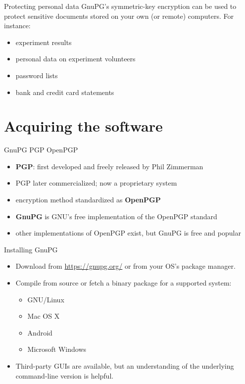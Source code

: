 \documentclass[
mode=present,
paper=smartboard,
size=20pt,
]{powerdot}
\begin{document}
\begin{slide}{Protecting personal data}
  GnuPG's symmetric-key encryption can be used to protect sensitive
  documents stored on your own (or remote) computers.  For instance:\\[1ex]
  \begin{itemize}
  \item experiment results
  \item personal data on experiment volunteers
  \item password lists
  \item bank and credit card statements
  \end{itemize}
\end{slide}


\section{Acquiring the software}

\begin{slide}{GnuPG \vs PGP \vs OpenPGP}
  \begin{itemize}
  \item \textbf{PGP}: first developed and freely released by Phil Zimmerman
  \item PGP later commercialized; now a proprietary system
  \item encryption method standardized as \textbf{OpenPGP}
  \item \textbf{GnuPG} is GNU's free implementation of the OpenPGP standard
  \item other implementations of OpenPGP exist, but GnuPG is free and
    popular
  \end{itemize}
\end{slide}

\begin{slide}{Installing GnuPG}
  \begin{itemize}
  \item Download from \url{https://gnupg.org/} or from your OS's package manager.
  \item Compile from source or fetch a binary package for a supported
    system:
    \begin{itemize}
    \item GNU/Linux
    \item Mac OS X
    \item Android
    \item Microsoft Windows
    \end{itemize}
  \item Third-party GUIs are available, but an understanding of the underlying
    command-line version is helpful.
  \end{itemize}
\end{slide}
\end{document}
